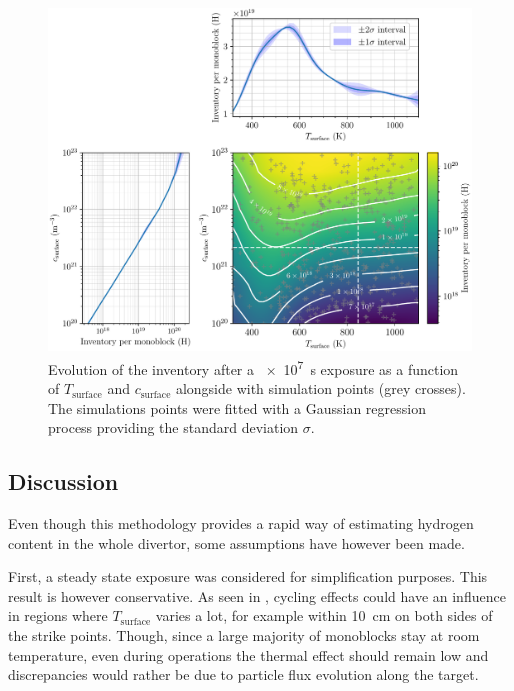 \begin{figure} [h]
    \centering
    \includegraphics[width=\linewidth]{Figures/Chapter3/monoblocks/parametric_study/inventory_T_c_profiles.pdf}
    \caption{Evolution of the inventory after a \SI{e7}{s} exposure as a function of $T_\mathrm{surface}$ and $c_\mathrm{surface}$ alongside with simulation points (grey crosses). The simulations points were fitted with a Gaussian regression process \cite{chris_bowman_c-bowmaninference-tools_2020} providing the standard deviation $\sigma$.}
\end{figure}

\subsection{Discussion}
Even though this methodology provides a rapid way of estimating hydrogen content in the whole divertor, some assumptions have however been made.


First, a steady state exposure was considered for simplification purposes.
This result is however conservative.
As seen in , cycling effects could have an influence in regions where $T_\mathrm{surface}$ varies a lot, for example within \SI{10}{cm} on both sides of the strike points.
Though, since a large majority of monoblocks stay at room temperature, even during operations the thermal effect should remain low and discrepancies would rather be due to particle flux evolution along the target.

